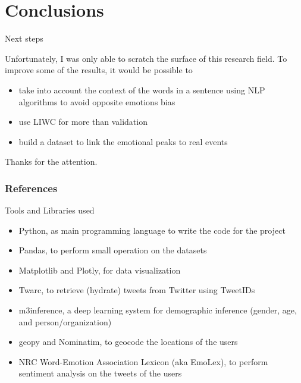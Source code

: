 \documentclass[8pt]{beamer}  %
\begin{document}
\section{Conclusions}

\begin{frame}{Next steps}
    
    Unfortunately, I was only able to scratch the surface of this research field. To improve some of the results, it would be possible to
    
    \begin{itemize}
        \item take into account the context of the words in a sentence using NLP algorithms to avoid opposite emotions bias
        \item use LIWC for more than validation
        \item build a dataset to link the emotional peaks to real events
    \end{itemize}
    
\end{frame}

\begin{frame}

    \begin{center}
        \Large{Thanks for the attention.}
    \end{center}

\end{frame}

\begin{frame}
        \frametitle{References}
        \printbibliography
\end{frame}












\begin{frame}{Tools and Libraries used}

    \begin{itemize}
        \item Python, as main programming language to write the code for the project
        \item Pandas, to perform small operation on the datasets
        \item Matplotlib and Plotly, for data visualization
        \item Twarc, to retrieve (hydrate) tweets from Twitter using TweetIDs
        \item m3inference, a deep learning system for demographic inference (gender, age, and person/organization)
        \item geopy and Nominatim, to geocode the locations of the users
        \item NRC Word-Emotion Association Lexicon (aka EmoLex), to perform sentiment analysis on the tweets of the users
    \end{itemize}
    
\end{frame}
\end{document}
